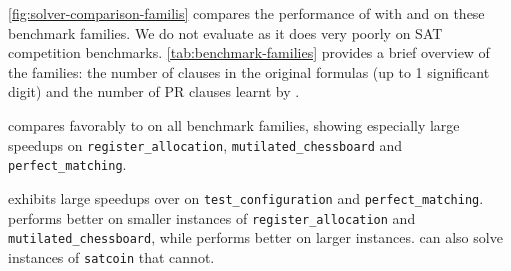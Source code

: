 \autoref{fig:solver-comparison-familis} compares the performance of \tool with
\cadical and \prelearn on these benchmark families. We do not evaluate \sadical
as it does very poorly on SAT competition benchmarks.
\autoref{tab:benchmark-families} provides a brief overview of the families: the
number of clauses in the original formulas (up to 1 significant digit) and the
number of PR clauses learnt by \tool.

\tool compares favorably to \cadical on all benchmark families, showing especially large speedups on
\texttt{register\_allocation}, \texttt{mutilated\_chessboard} and
\texttt{perfect\_matching}. 

\prelearn exhibits large speedups over \tool on \texttt{test\_configuration} and
\texttt{perfect\_matching}. \tool performs better on smaller instances of
\texttt{register\_allocation} and \texttt{mutilated\_chessboard}, while
\prelearn performs better on larger instances. \tool can also solve instances of
\texttt{satcoin} that \prelearn cannot.





















